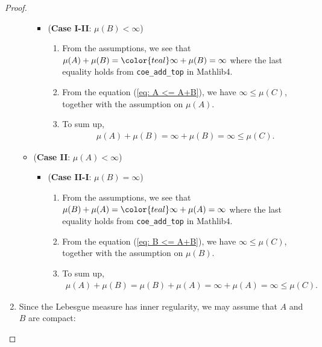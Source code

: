 \begin{proof}
\begin{enumerate}
\begin{itemize}
\begin{itemize}
                \item (\textbf{Case I-II}: \(\mu(B) < \infty\)) 
                \begin{enumerate}
                    \item From the assumptions, we see that \(\mu(A) + \mu(B) = {\color{teal}\infty + \mu(B) = \infty}\) where the last equality holds from \texttt{coe\_add\_top} in Mathlib4. 
                    \item From the equation (\ref{eq: A <= A+B}), we have \(\infty \leq \mu(C)\), together with the assumption on \(\mu(A)\).
                    \item To sum up,
                    \begin{eqnarray*}
                        \mu(A) + \mu (B) = \infty + \mu(B) = \infty \leq \mu(C).
                    \end{eqnarray*}
                \end{enumerate}
            \end{itemize}
            \item (\textbf{Case II}: \(\mu(A) < \infty\))
            \begin{itemize}
                \item (\textbf{Case II-I}: \(\mu(B)=\infty\))
                \begin{enumerate}
                    \item From the assumptions, we see that \(\mu(B) + \mu(A) = {\color{teal}\infty + \mu(A) = \infty}\) where the last equality holds from \texttt{coe\_add\_top} in Mathlib4. 
                    \item From the equation (\ref{eq: B <= A+B}), we have \(\infty \leq \mu(C)\), together with the assumption on \(\mu(B)\).
                    \item To sum up,
                    \begin{eqnarray*}
                        \mu(A) + \mu (B) = \mu(B) + \mu(A) = \infty + \mu(A) = \infty \leq \mu(C).
                    \end{eqnarray*}
                \end{enumerate}
            \end{itemize}
        \end{itemize}

        
        \item Since {\color{teal}the Lebesgue measure has inner regularity}, we may assume that \(A\) and \(B\) are compact:


\end{enumerate}
\end{proof}

